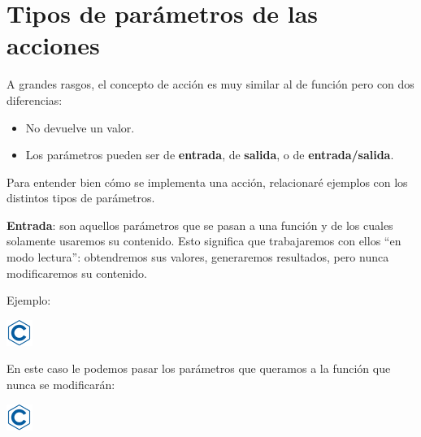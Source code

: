 \documentclass[]{book}
\newenvironment{Shaded}{\begin{snugshade}}{\end{snugshade}}
\newcommand{\DataTypeTok}[1]{\textcolor[rgb]{0.13,0.29,0.53}{#1}}
\newcommand{\SpecialCharTok}[1]{\textcolor[rgb]{0.00,0.00,0.00}{#1}}
\newcommand{\StringTok}[1]{\textcolor[rgb]{0.31,0.60,0.02}{#1}}
\newcommand{\NormalTok}[1]{#1}
\providecommand{\tightlist}{%
  \setlength{\itemsep}{0pt}\setlength{\parskip}{0pt}}
\begin{document}
\section{Tipos de parámetros de las
acciones}\label{tipos-de-parametros-de-las-acciones}

A grandes rasgos, el concepto de acción es muy similar al de función
pero con dos diferencias:

\begin{itemize}
\tightlist
\item
  No devuelve un valor.
\item
  Los parámetros pueden ser de \textbf{entrada}, de \textbf{salida}, o
  de \textbf{entrada/salida}.
\end{itemize}

Para entender bien cómo se implementa una acción, relacionaré ejemplos
con los distintos tipos de parámetros.

\textbf{Entrada}: son aquellos parámetros que se pasan a una función y
de los cuales solamente usaremos su contenido. Esto significa que
trabajaremos con ellos ``en modo lectura'': obtendremos sus valores,
generaremos resultados, pero nunca modificaremos su contenido.

Ejemplo:

\includegraphics{./img/c.png}

\begin{Shaded}
\end{Shaded}

En este caso le podemos pasar los parámetros que queramos a la función
que nunca se modificarán:

\includegraphics{./img/c.png}
\end{document}

